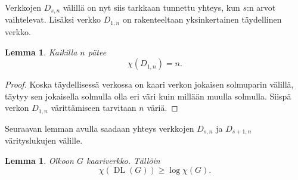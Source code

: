 \documentclass[finnish]{tktltiki2}
\newtheorem{lem}[lau]{Lemma}
\theoremstyle{definition}
\theoremstyle{remark}
\DeclareMathOperator{\DL}{DL}
\newcommand{\Dsn}{D_{s,n}}
\newcommand{\Dssn}{D_{s+1,n}}
\begin{document}

Verkkojen $\Dsn$ välillä on nyt siis tarkkaan tunnettu yhteys, kun $s$:n arvot
vaihtelevat. Lisäksi verkko $D_{1,n}$ on rakenteeltaan yksinkertainen
täydellinen verkko.

\begin{lem}
    Kaikilla $n$ pätee
    \begin{equation*}
        \chi(D_{1,n}) = n.
    \end{equation*}
\end{lem}

\begin{proof}
    Koska täydellisessä verkossa on kaari verkon jokaisen solmuparin välillä,
    täytyy sen jokaisella solmulla olla eri väri kuin millään muulla solmulla.
    Siispä verkon $D_{1,n}$ värittämiseen tarvitaan $n$ väriä.
\end{proof}

Seuraavan lemman avulla saadaan yhteys verkkojen $\Dsn$ ja $\Dssn$
vä\-ri\-tys\-lu\-ku\-jen välille.

\newcommand{\DLG}{\DL(G)}

\begin{lem}
    Olkoon $G$ kaariverkko. Tällöin
    \begin{equation*}
        \chi(\DLG) \geq \log \chi(G).
    \end{equation*}
\end{lem}
\end{document}
